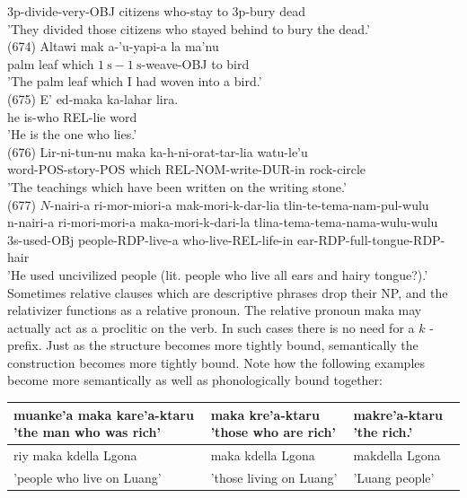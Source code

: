 \documentclass[10pt]{article}
\begin{document}
3p-divide-very-OBJ citizens who-stay to 3p-bury dead\\
'They divided those citizens who stayed behind to bury the dead.'\\
(674) Altawi mak a-'u-yapi-a la ma'nu\\
palm leaf which \(1 \mathrm{~s}-1 \mathrm{~s}\)-weave-OBJ to bird\\
'The palm leaf which I had woven into a bird.'\\
(675) E' ed-maka ka-lahar lira.\\
he is-who REL-lie word\\
'He is the one who lies.'\\
(676) Lir-ni-tun-nu maka ka-h-ni-orat-tar-lia watu-le'u\\
word-POS-story-POS which REL-NOM-write-DUR-in rock-circle\\
'The teachings which have been written on the writing stone.'\\
(677) \(N\)-nairi-a ri-mor-miori-a mak-mori-k-dar-lia tlin-te-tema-nam-pul-wulu\\
n-nairi-a ri-mori-mori-a maka-mori-k-dari-la tlina-tema-tema-nama-wulu-wulu\\
3s-used-OBj people-RDP-live-a who-live-REL-life-in ear-RDP-full-tongue-RDP-hair\\
'He used uncivilized people (lit. people who live all ears and hairy tongue?).'\\
Sometimes relative clauses which are descriptive phrases drop their NP, and the relativizer functions as a relative pronoun. The relative pronoun maka may actually act as a proclitic on the verb. In such cases there is no need for a \(k\) - prefix. Just as the structure becomes more tightly bound, semantically the construction becomes more tightly bound. Note how the following examples become more semantically as well as phonologically bound together:

\begin{center}
\begin{tabular}{|l|l|l|}
\hline
muanke'a maka kare'a-ktaru 'the man who was rich' & maka kre'a-ktaru 'those who are rich' & makre'a-ktaru 'the rich.' \\
\hline
riy maka kdella Lgona & maka kdella Lgona & makdella Lgona \\
\hline
'people who live on Luang' & 'those living on Luang' & 'Luang people' \\
\hline
\end{tabular}
\end{center}
\end{document}
